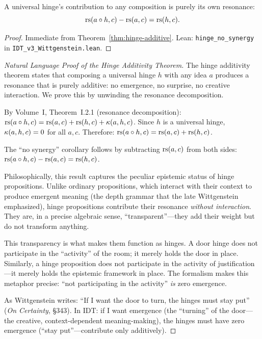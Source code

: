 \begin{theorem}
\label{thm:hinge-no-synergy}
A universal hinge's contribution to any composition is purely its own resonance:
\[
\mathrm{rs}(a \circ h, c) - \mathrm{rs}(a, c) = \mathrm{rs}(h, c).
\]
\end{theorem}

\begin{proof}
Immediate from Theorem~\ref{thm:hinge-additive}.
Lean: \texttt{hinge\_no\_synergy} in \texttt{IDT\_v3\_Wittgenstein.lean}.
\end{proof}

\begin{proof}[Natural Language Proof of the Hinge Additivity Theorem]
The hinge additivity theorem states that composing a universal hinge $h$ with
any idea $a$ produces a resonance that is purely additive: no emergence, no
surprise, no creative interaction. We prove this by unwinding the resonance
decomposition.

By Volume~I, Theorem~I.2.1 (resonance decomposition):
$\mathrm{rs}(a \circ h, c) = \mathrm{rs}(a, c) + \mathrm{rs}(h, c) + \kappa(a, h, c)$.
Since $h$ is a universal hinge, $\kappa(a, h, c) = 0$ for all $a, c$.
Therefore: $\mathrm{rs}(a \circ h, c) = \mathrm{rs}(a, c) + \mathrm{rs}(h, c)$.

The ``no synergy'' corollary follows by subtracting $\mathrm{rs}(a, c)$ from both sides:
$\mathrm{rs}(a \circ h, c) - \mathrm{rs}(a, c) = \mathrm{rs}(h, c)$.

Philosophically, this result captures the peculiar epistemic status of hinge
propositions. Unlike ordinary propositions, which interact with their context
to produce emergent meaning (the depth grammar that the late Wittgenstein
emphasized), hinge propositions contribute their resonance \emph{without
interaction}. They are, in a precise algebraic sense, ``transparent''---they
add their weight but do not transform anything.

This transparency is what makes them function as hinges. A door hinge does not
participate in the ``activity'' of the room; it merely holds the door in place.
Similarly, a hinge proposition does not participate in the activity of
justification---it merely holds the epistemic framework in place. The
formalism makes this metaphor precise: ``not participating in the activity''
\emph{is} zero emergence.

As Wittgenstein writes: ``If I want the door to turn, the hinges must stay put''
(\textit{On Certainty}, \S343). In IDT: if I want emergence (the ``turning''
of the door---the creative, context-dependent meaning-making), the hinges
must have zero emergence (``stay put''---contribute only additively).
\end{proof}


